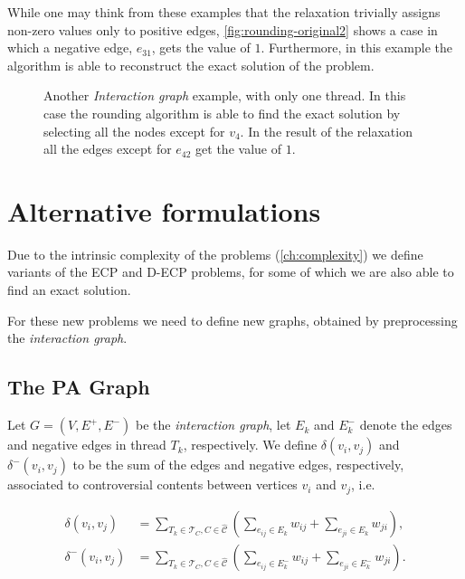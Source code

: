 While one may think from these examples that the relaxation trivially assigns
non-zero values only to positive edges, \autoref{fig:rounding-original2} shows
a case in which a negative edge, $e_{31}$, gets the value of $1$. Furthermore,
in this example the algorithm is able to reconstruct the exact solution of the problem.

\begin{figure}
	\centering
	\caption[Example of rounding algorithm finding the exact solution]{Another
		\emph{Interaction graph} example, with only one thread. In
		this case the rounding algorithm is able to find the exact solution by
		selecting all the nodes except for $v_4$. In the result of the
		relaxation all the edges except for $e_{42}$ get the value of $1$.}%
	\label{fig:rounding-original2}
\end{figure}

\section{Alternative formulations}%
\label{sec:alternative-formulations}

Due to the intrinsic complexity of the problems
(\autoref{ch:complexity}) we define variants of
the \acrshort{ECP} and \acrshort{D-ECP} problems, for some of which we are also able to find an exact solution.

For these new problems we need to define new graphs, obtained by preprocessing
the \emph{interaction graph}.

\subsection{The \acrlong{PA} Graph}%
\label{sub:pa-graph}

Let $G = (V, E^{+}, E^{-})$ be the \emph{interaction graph}, let $E_k$ and
$E^-_k$ denote the edges and negative edges in thread $T_k$,
respectively. We define $\delta(v_{i}, v_{j})$ and
$\delta^{-} (v_{i}, v_{j})$ to be the sum of the edges and negative edges, respectively,
associated to controversial contents between vertices $v_{i} $ and $v_{j}
$, i.e.\

\begin{align}
	\label{eq:}
	\delta(v_{i}, v_{j})   & = \sum^{}_{T_k \in \mathcal{T}_C, C \in
	\mathcal{\hat{C}} } ( \sum^{}_{e_{ij} \in E_k} w_{ij} + \sum^{}_{e_{ji} \in
	E_k} w_{ji} ),
	\\
	\delta^-(v_{i}, v_{j}) & = \sum^{}_{T_k \in \mathcal{T}_C, C \in
	\mathcal{\hat{C}} } ( \sum^{}_{e_{ij} \in E^-_k} w_{ij} + \sum^{}_{e_{ji} \in
	E^-_k} w_{ji} ).
\end{align}

